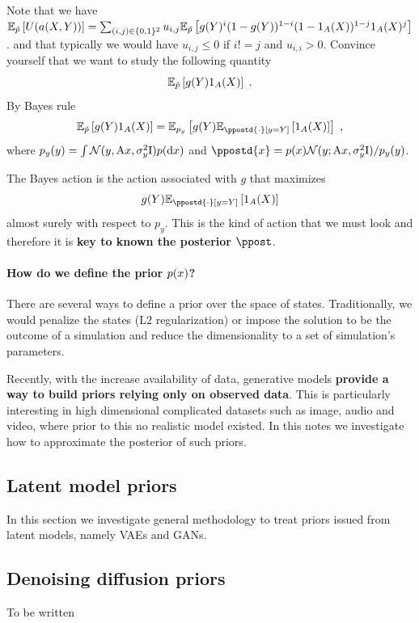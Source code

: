 Note that we have $\mathbb{E}_{\tilde{p}}\left[U(a(X, Y))\right] = \sum_{(i, j) \in \{0, 1\}^2} u_{i, j} \mathbb{E}_{\tilde{p}}\left[g(Y)^{i}(1 - g(Y))^{1-i}(1 - \mathrm{1}_{A}(X))^{1-j}\mathrm{1}_{A}(X)^j\right]$.
and that typically we would have $u_{i, j} \leq 0$ if $i != j$ and $u_{i, i} > 0$.
Convince yourself that we want to study the following quantity 
\[
    \mathbb{E}_{\tilde{p}}\left[g(Y) \mathrm{1}_{A}(X)\right] \;.
\]  
By Bayes rule
\[
    \PE{\tilde{p}}{g(Y) \indi{A}(\state)} = \PE{p_y}{g(Y) \PE{\ppostd{\cdot}[y=Y]}{\indi{A}(\state)}} \eqsp,
\] 
where $p_y(y) = \int \mathcal{N}(y, \mathrm{A}x, \sigma_y^2 \mathrm{I}) p(\mathrm{d} x)$ and $\ppostd{\lstate} =  p(\lstate) \gauss(y; \m{A}x, \sigma_y^2 \idm) / p_y(y)$.

The Bayes action is the action associated with $g$ that maximizes
\begin{equation}
    \label{eq:bayes_action}
    g(Y) \PE{\ppostd{\cdot}[y=Y]}{\indi{A}(\state)}    
\end{equation}
almost surely with respect to $p_y$. This is the kind of action that we must look and therefore it is \textbf{key to known the posterior $\ppost$}.

\paragraph{How do we define the prior $p(x)$?}

There are several ways to define a prior over the space of states. Traditionally, we would penalize the states (L$2$ regularization) or impose the solution to be the outcome
of a simulation and reduce the dimensionality to a set of simulation's parameters.

Recently, with the increase availability of data, generative models \textbf{provide a way to build priors relying only on observed data}.
This is particularly interesting in high dimensional complicated datasets such as image, audio and video, where prior to this no realistic model existed.
In this notes we investigate how to approximate the posterior of such priors.

\subsection{Latent model priors}

In this section we investigate general methodology to treat priors issued from latent models, namely VAEs and GANs.

\subsection{Denoising diffusion priors}

To be written
